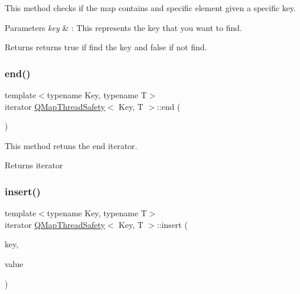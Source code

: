 This method checks if the map contains and specific element given a specific key. 


\begin{DoxyParams}{Parameters}
{\em key} & \+: This represents the key that you want to find. \\
\hline
\end{DoxyParams}
\begin{DoxyReturn}{Returns}
returns true if find the key and false if not find. 
\end{DoxyReturn}
\mbox{\label{class_q_map_thread_safety_a64a700a04a692176f00e119500dd1b23}} 
\subsubsection{\texorpdfstring{end()}{end()}}
{\footnotesize\ttfamily template$<$typename Key, typename T$>$ \\
iterator \hyperlink{class_q_map_thread_safety}{Q\+Map\+Thread\+Safety}$<$ Key, T $>$\+::end (\begin{DoxyParamCaption}{ }\end{DoxyParamCaption})\hspace{0.3cm}{\ttfamily [inline]}}



This method retuns the end iterator. 

\begin{DoxyReturn}{Returns}
iterator 
\end{DoxyReturn}
\mbox{\label{class_q_map_thread_safety_a156afe871591b26ce155da6ce6409ad6}} 
\subsubsection{\texorpdfstring{insert()}{insert()}}
{\footnotesize\ttfamily template$<$typename Key, typename T$>$ \\
iterator \hyperlink{class_q_map_thread_safety}{Q\+Map\+Thread\+Safety}$<$ Key, T $>$\+::insert (\begin{DoxyParamCaption}\item[{const Key \&}]{key,  }\item[{const T \&}]{value }\end{DoxyParamCaption})\hspace{0.3cm}{\ttfamily [inline]}}



